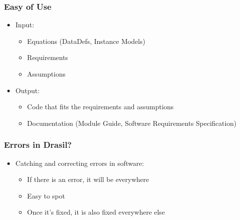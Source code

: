 \documentclass{beamer}
\begin{document}
\begin{frame}
\frametitle{Easy of Use}
\begin{itemize}
 \item<1-> Input:
  \begin{itemize}
   \item<2-> Equations (DataDefs, Instance Models)
   \item<3-> Requirements
   \item<4-> Assumptions
  \end{itemize}
 \item<5-> Output:
  \begin{itemize}
   \item<6-> Code that fits the requirements and assumptions
   \item<7-> Documentation (Module Guide, Software Requirements Specification)
  \end{itemize}
\end{itemize}
\end{frame}

\begin{frame}
\frametitle{Errors in Drasil?}
\begin{itemize}
 \item<1-> Catching and correcting errors in software:
  \begin{itemize}
   \item<2-> If there is an error, it will be everywhere
   \item<3-> Easy to spot
   \item<4-> Once it's fixed, it is also fixed everywhere else
  \end{itemize}
\end{itemize}
\end{frame}
\end{document}
